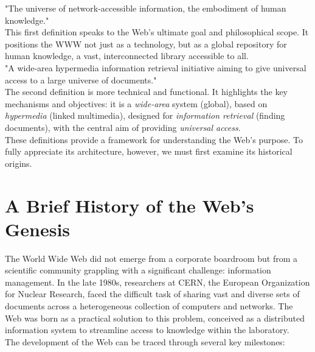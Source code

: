 \documentclass{scrbook}
\begin{document}
"The universe of network-accessible information, the embodiment of human knowledge." \\

This first definition speaks to the Web's ultimate goal and philosophical scope. It positions the WWW not just as a technology, but as a global repository for human knowledge, a vast, interconnected library accessible to all. \\

"A wide-area hypermedia information retrieval initiative aiming to give universal access to a large universe of documents." \\

The second definition is more technical and functional. It highlights the key mechanisms and objectives: it is a \textit{wide-area} system (global), based on \textit{hypermedia} (linked multimedia), designed for \textit{information retrieval} (finding documents), with the central aim of providing \textit{universal access}. \\

These definitions provide a framework for understanding the Web's purpose. To fully appreciate its architecture, however, we must first examine its historical origins.

\chapter{A Brief History of the Web's Genesis}

The World Wide Web did not emerge from a corporate boardroom but from a scientific community grappling with a significant challenge: information management. In the late 1980s, researchers at CERN, the European Organization for Nuclear Research, faced the difficult task of sharing vast and diverse sets of documents across a heterogeneous collection of computers and networks. The Web was born as a practical solution to this problem, conceived as a distributed information system to streamline access to knowledge within the laboratory. \\

The development of the Web can be traced through several key milestones: \\
\end{document}
